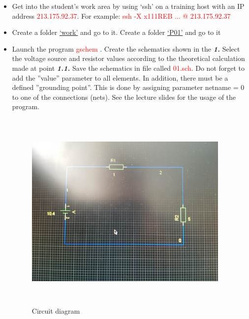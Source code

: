 \documentclass{report}
\begin{document}
\begin{itemize}
\item Get into the student’s work area by using ‘ssh’ on a training host with an IP address
\textcolor{red}{213.175.92.37}. For example: \textcolor{red}{ssh -X x111REB ... @ 213.175.92.37}
  \item Create a folder \underline{‘work’} and go to it. Create a folder \underline{‘P01’} and go to it
  \item Launch the program \textcolor{red}{gschem} . Create the schematics shown in the \textbf{\textit{1. }}Select the voltage
source and resistor values according to the theoretical calculation made at point \textbf{\textit{1.1.}}
Save the schematics in file called \textcolor{red}{01.sch}. Do not forget to add the ”value” parameter
to all elements. In addition, there must be a defined ”grounding point”. This is done by
assigning parameter netname = 0 to one of the connections (nets). See the lecture slides
for the usage of the program. \cite{book2}

\begin{figure}[!tb]
\includegraphics[width=10cm,height=10cm,keepaspectratio]{gschem-diagram.jpg}
\caption{Circuit diagram}
\end{figure}


\end{itemize}
\end{document}
